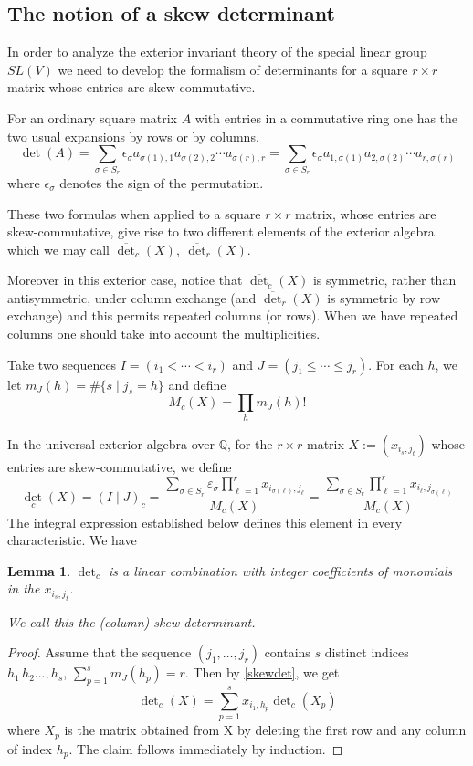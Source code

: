\documentclass[10pt]{amsart}
\newcommand{\e}{\epsilon}
\newtheorem{lemma}[theorem]{Lemma}
\theoremstyle{definition}
\theoremstyle{remark}
\newcommand{\Q}{\mathbb Q}
\begin{document}
\subsection{The notion of a skew determinant} In order to analyze the exterior invariant theory of the special linear group $SL(V)$  we need to develop the formalism of 
  determinants  for a square $r\times r$    matrix whose entries are skew-commutative. \smallskip
  
  For an ordinary square matrix $A$ with entries in a commutative ring one has the two usual expansions  by rows or by columns.
  $$\det(A)=\sum_{\sigma\in S_r} \e_\sigma a_ {\sigma(1),1} a_ {\sigma(2),2}\cdots   a_ {\sigma(r),r}=  \sum_{\sigma\in S_r} \e_\sigma a_ {1,\sigma(1) } a_ {2,\sigma(2) }\cdots   a_ {r,\sigma(r) } $$ where $ \e_\sigma$ denotes the sign of the permutation.
  
  These two formulas  when applied  to  a square $r\times r$    matrix, whose entries are skew-commutative, give rise to two different  elements of the exterior algebra which we may call $\overline{\det}_c(X),\  \overline{\det}_r(X)$.\smallskip
  
  
Moreover in this exterior case, notice  that    $\overline{\det}_c(X)$ is symmetric, rather than antisymmetric, under column exchange (and  $\overline{\det}_r(X)$ is symmetric   by row exchange) and this permits repeated columns (or rows).  When we have repeated columns one should take into account the multiplicities.

  

Take two sequences $I=(i_1<\cdots < i_r)$ and $J=(j_1\leq\cdots \leq j_r).$   For each $h$, we let $m_J(h)=\#\{s\mid j_s=h\}$ and define
\[M_c(X)=\prod_hm_J(h)!\]

In the universal exterior algebra over $\Q$, for the $r\times r$ matrix $X:=(x_{i_s,j_t})$ whose entries are skew-commutative, we define 
\begin{equation}\label{skewdet} { {\det}_c}(X)=(I\mid J)_c=\frac{\sum_{\sigma\in S_r}\varepsilon_\sigma\prod_{\ell=1}^rx_{i_{\sigma(\ell)},j_\ell}}{M_c(X)}=\frac{\sum_{\sigma\in S_r}\prod_{\ell=1}^rx_{i_\ell,j_{\sigma(\ell)}}}{M_c(X)}\end{equation}
The integral expression established below defines this element in every characteristic. We have
\begin{lemma}  ${\det}_c$ is a linear combination with integer coefficients of monomials in the $x_{i_s,j_t}$.

We call this the (column) skew determinant. \end{lemma}
\begin{proof} Assume 
that the sequence 
\((j_1,\ldots ,j_r)\)  contains $s$ distinct indices $h_1\,h_2\ldots ,h_s$, $\sum_{p=1}^s m_J(h_p)=r$. Then by \eqref{skewdet}, we get
\[\det\nolimits_c(X)=\sum_{p=1}^s x_{i_1,h_p}\det\nolimits_c(X_p)\]
where $X_p$ is the matrix obtained from X by deleting the first row and any column of index $h_p$. The claim follows immediately by induction.
\end{proof}
\end{document}

